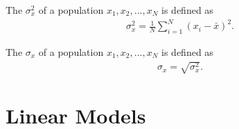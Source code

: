 \documentclass{article}
\begin{document}
\begin{definition}
	The  $\sigma_x^2$ of a population $x_1, x_2, ..., x_N$ is defined as
	\begin{align*}
		\sigma_x^2 =\frac{1}{N}\sum_{i=1}^N (x_i-\bar x)^2.
	\end{align*}
\end{definition}
\begin{definition}
	The  $\sigma_x$ of a population $x_1, x_2, ..., x_N$ is defined as
	\begin{align*}
		\sigma_x = \sqrt{\sigma_x^2}.
	\end{align*}
\end{definition}


\section{Linear Models}
\end{document}
